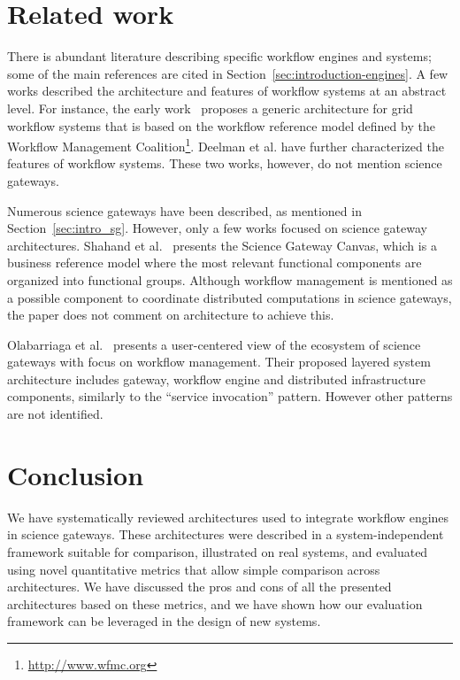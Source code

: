 \documentclass[preprint,3p,twocolumn]{elsarticle}
\newcommand{\correction}[1]{\color{blue}#1\color{black}\xspace}
\begin{document}
\section{Related work}
\label{sec:related}
 
There is abundant literature describing specific workflow engines and
systems; some of the main references are cited in
Section~\ref{sec:introduction-engines}. A few works described the
architecture and features of workflow systems at an abstract level. For
instance, the early work~\cite{yuTaxonomy} proposes a generic
architecture for grid workflow systems that is based on the workflow
reference model defined by the Workflow Management
Coalition\footnote{\url{http://www.wfmc.org}}.  Deelman et
al. \cite{deelman2009workflows} have further characterized the
features of workflow systems. These two works, however, do not mention
science gateways.

Numerous science gateways have been described, as mentioned in
Section~\ref{sec:intro_sg}. However, only a few works focused on
science gateway architectures. Shahand et al.~\cite{shahand:2015ab}
presents the Science Gateway Canvas, which is a business reference
model where the most relevant functional components are organized into
functional groups. Although workflow management is mentioned as a
possible component to coordinate distributed computations in science
gateways, the paper does not comment on architecture to achieve this.

Olabarriaga et al.~\cite{olabarriaga2014} presents a user-centered
view of the ecosystem of science gateways with focus on workflow
management. Their proposed layered system architecture includes
gateway, workflow engine and distributed infrastructure components,
similarly to the ``service invocation'' pattern. However other patterns
are not identified.

\section{Conclusion}

We have systematically reviewed architectures used to integrate
workflow engines in science gateways. These architectures were
described in a system-independent framework suitable for comparison,
illustrated on real systems, and evaluated using novel quantitative
metrics that allow simple comparison across architectures. We have
discussed the pros and cons of all the presented architectures based
on these metrics, \correction{and we have shown how our evaluation
  framework can be leveraged in the design of new systems}.
\end{document}
